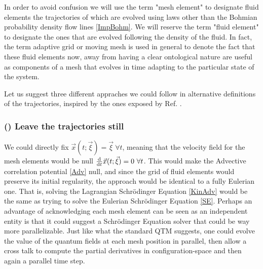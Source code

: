 \documentclass[11pt, a4paper]{article} %
\begin{document}
In order to avoid confusion we will use the term "mesh element" to designate fluid elements the trajectories of which are evolved using laws other than the Bohmian probability density flow lines \eqref{ImpBohm}. We will reserve the term "fluid element" to designate the ones that are evolved following the density of the fluid. In fact, the term adaptive grid or moving mesh is used in general to denote the fact that these fluid elements now, away from having a clear ontological nature are useful as components of a mesh that evolves in time adapting to the particular state of the system.

Let us suggest three different appraches we could follow in alternative definitions of the trajectories, inspired by the ones exposed by Ref. \cite{Wyatt}.

\subsubsection*{\bf (\textalpha) Leave the trajectories still}
 We could directly fix $\vec{x}(t;\vec{\xi})=\vec{\xi}\ \forall t$, meaning that the velocity field for the mesh elements would be null $\dv{}{t}\vec{x}(t;\vec{\xi})=0\ \forall t$. This would make the Advective correlation potential \eqref{Adv} null, and since the grid of fluid elements would preserve its initial regularity, the approach would be identical to a fully Eulerian one. That is, solving the Lagrangian Schrödinger Equation \eqref{KinAdv} would be the same as trying to solve the Eulerian Schrödinger Equation \eqref{SE}. Perhaps an advantage of acknowledging each mesh element can be seen as an independent entity is that it could suggest a Schrödinger Equation solver that could be way more parallelizable. Just like what the standard QTM suggests, one could evolve the value of the quantum fields at each mesh position in parallel, then allow a cross talk to compute the partial derivatives in configuration-space and then again a parallel time step.
\end{document}
